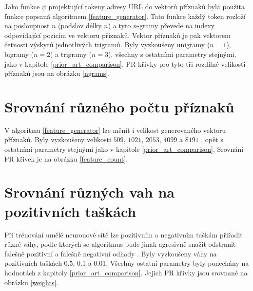Jako funkce \( \psi \) projektující tokeny adresy URL do vektorů příznaků byla použita funkce popsaná algoritmem \ref{feature_generator}. Tato funkce každý token rozloží na posloupnost \( n \) (podslov délky \( n \)) a tyto \( n \)-gramy převede na indexy odpovídající pozicím ve vektoru příznaků. Vektor příznaků je pak vektorem četnosti výskytů jednotlivých trigramů. Byly vyzkoušeny unigramy (\( n = 1 \)), bigramy  (\( n = 2 \)) a trigramy (\( n = 3 \)), všechny s ostatními parametry stejnými, jako v kapitole \ref{prior_art_comparison}. PR křivky pro tyto tři rozdílné velikosti příznaků jsou na obrázku \ref{ngrams}.


\section{Srovnání různého počtu příznaků}
V algoritmu \ref{feature_generator} lze měnit i velikost generovaného vektoru příznaků. Byly vyzkoušeny velikosti \( 509 \), \( 1021 \), \( 2053 \), \( 4099 \) a \( 8191 \) , opět s ostatními parametry stejnými jako v kapitole \ref{prior_art_comparison}. Srovnání PR křivek je na obrázku \ref{feature_count}.


\section{Srovnání různých vah na pozitivních taškách}
Při trénování umělé neuronové sítě lze pozitivním a negativním taškám přiřadit různé váhy, podle kterých se algoritmus bude jinak agresivně snažit odstranit falešně pozitivní a falešně negativní odhady . Byly vyzkoušeny váhy na pozitivních taškách \( 0.5 \), \( 0.1 \) a \( 0.01 \). Všechny ostatní parametry byly ponechány na hodnotách z kapitoly \ref{prior_art_comparison}. Jejich PR křivky jsou srovnané na obrázku \ref{weights}.

